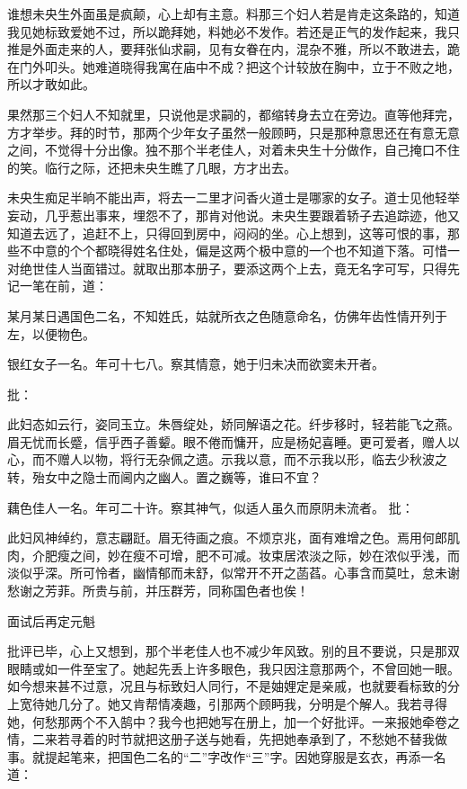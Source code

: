 \documentclass[a4paper,12pt,UTF8,twoside]{ctexbook}
\begin{document}
谁想未央生外面虽是疯颠，心上却有主意。料那三个妇人若是肯走这条路的，知道我见她标致爱她不过，所以跪拜她，料她必不发作。若还是正气的发作起来，我只推是外面走来的人，要拜张仙求嗣，见有女眷在内，混杂不雅，所以不敢进去，跪在门外叩头。她难道晓得我寓在庙中不成？把这个计较放在胸中，立于不败之地，所以才敢如此。

果然那三个妇人不知就里，只说他是求嗣的，都缩转身去立在旁边。直等他拜完，方才举步。拜的时节，那两个少年女子虽然一般顾眄，只是那种意思还在有意无意之间，不觉得十分出像。独不那个半老佳人，对着未央生十分做作，自己掩口不住的笑。临行之际，还把未央生瞧了几眼，方才出去。

未央生痴足半晌不能出声，将去一二里才问香火道士是哪家的女子。道士见他轻举妄动，几乎惹出事来，埋怨不了，那肯对他说。未央生要跟着轿子去追踪迹，他又知道去远了，追赶不上，只得回到房中，闷闷的坐。心上想到，这等可恨的事，那些不中意的个个都晓得姓名住处，偏是这两个极中意的一个也不知道下落。可惜一对绝世佳人当面错过。就取出那本册子，要添这两个上去，竟无名字可写，只得先记一笔在前，道：

某月某日遇国色二名，不知姓氏，姑就所衣之色随意命名，仿佛年齿性情开列于左，以便物色。

银红女子一名。年可十七八。察其情意，她于归未决而欲窦未开者。

批：

此妇态如云行，姿同玉立。朱唇绽处，娇同解语之花。纤步移时，轻若能飞之燕。眉无忧而长蹙，信乎西子善颦。眼不倦而慵开，应是杨妃喜睡。更可爱者，赠人以心，而不赠人以物，将行无杂佩之遗。示我以意，而不示我以形，临去少秋波之转，殆女中之隐士而阃内之幽人。置之巍等，谁曰不宜？

藕色佳人一名。年可二十许。察其神气，似适人虽久而原阴未流者。 批：

此妇风神绰约，意志翩跹。眉无待画之痕。不烦京兆，面有难增之色。焉用何郎肌肉，介肥瘦之间，妙在瘦不可增，肥不可减。妆束居浓淡之际，妙在浓似乎浅，而淡似乎深。所可怜者，幽情郁而未舒，似常开不开之菡萏。心事含而莫吐，怠未谢愁谢之芳菲。所贵与前，并压群芳，同称国色者也俟！

面试后再定元魁

批评已毕，心上又想到，那个半老佳人也不减少年风致。别的且不要说，只是那双眼睛或如一件至宝了。她起先丢上许多眼色，我只因注意那两个，不曾回她一眼。如今想来甚不过意，况且与标致妇人同行，不是妯娌定是亲戚，也就要看标致的分上宽待她几分了。她又肯帮情凑趣，引那两个顾眄我，分明是个解人。我若寻得她，何愁那两个不入鹄中？我今也把她写在册上，加一个好批评。一来报她牵卷之情，二来若寻着的时节就把这册子送与她看，先把她奉承到了，不愁她不替我做事。就提起笔来，把国色二名的“二”字改作“三”字。因她穿服是玄衣，再添一名道：
\end{document}
